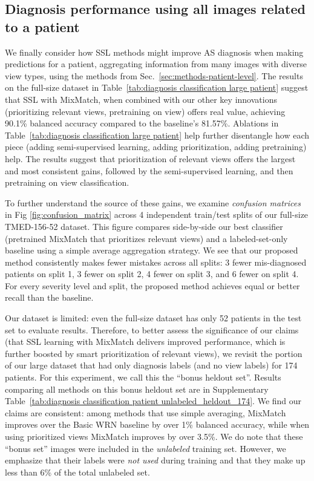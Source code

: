 \subsection{Diagnosis performance using all images related to a patient}
\label{sec:results-diagnosis-from-patient}

We finally consider how SSL methods might improve AS diagnosis when making predictions for a patient, aggregating information from many images with diverse view types, using the methods from Sec.~\ref{sec:methods-patient-level}.
The results on the full-size dataset in Table~\ref{tab:diagnosis classification large patient} suggest that SSL with MixMatch, when combined with our other key innovations (prioritizing relevant views, pretraining on view) offers real value, achieving 90.1\% balanced accuracy compared to the baseline's 81.57\%. Ablations in Table~\ref{tab:diagnosis classification large patient} help further disentangle how each piece (adding semi-supervised learning, adding prioritization, adding pretraining) help. The results suggest that prioritization of relevant views offers the largest and most consistent gains, followed by the semi-supervised learning, and then pretraining on view classification.

To further understand the source of these gains, we examine \emph{confusion matrices} in Fig \ref{fig:confusion_matrix} across 4 independent train/test splits of our full-size TMED-156-52 dataset.
This figure compares side-by-side our best classifier (pretrained MixMatch that prioritizes relevant views) and a labeled-set-only baseline using a simple average aggregation strategy.
We see that our proposed method consistently makes fewer mistakes across all splits: 3 fewer mis-diagnosed patients on split 1, 3 fewer on split 2, 4 fewer on split 3, and 6 fewer on split 4.  
For every severity level and split, the proposed method achieves equal or better recall than the baseline.

Our dataset is limited: even the full-size dataset has only 52 patients in the test set to evaluate results. 
Therefore, to better assess the significance of our claims (that SSL learning with MixMatch delivers improved performance, which is further boosted by smart prioritization of relevant views), we revisit the portion of our large dataset that had only diagnosis labels (and no view labels) for 174 patients. For this experiment, we call this the ``bonus heldout set''.
Results comparing all methods on this bonus heldout set are in Supplementary Table~\ref{tab:diagnosis classification patient unlabeled_heldout_174}.
We find our claims are consistent: among methods that use simple averaging, MixMatch improves over the Basic WRN baseline by over 1\% balanced accuracy, while when using prioritized views MixMatch improves by over 3.5\%.
We do note that these ``bonus set'' images were included in the \emph{unlabeled} training set. However, we emphasize that their labels were \emph{not used} during training and that they make up less than 6\% of the total unlabeled set.

